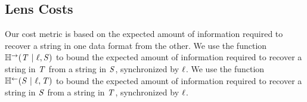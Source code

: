 \documentclass[acmsmall,screen,anonymous]{acmart}
\begin{document}
\subsection{Lens Costs}
Our cost metric is based on the expected amount of information required to
recover a string in one data format from the other. We use the function
$\mathbb{H}^\rightarrow(\mathit{T} ~|~ \mathit{\ell}, \mathit{S})$ to bound
the expected amount of 
information required to recover a string in $\mathit{T}$ from a string in
$\mathit{S}$, synchronized by $\mathit{\ell}$. We use the function $\mathbb{H}^\leftarrow(\mathit{S}
  ~|~ \mathit{\ell}, \mathit{T})$ to bound the expected amount of information required
to recover a string in $\mathit{S}$ from a string in $\mathit{T}$, synchronized by
$\mathit{\ell}$.
\end{document}
